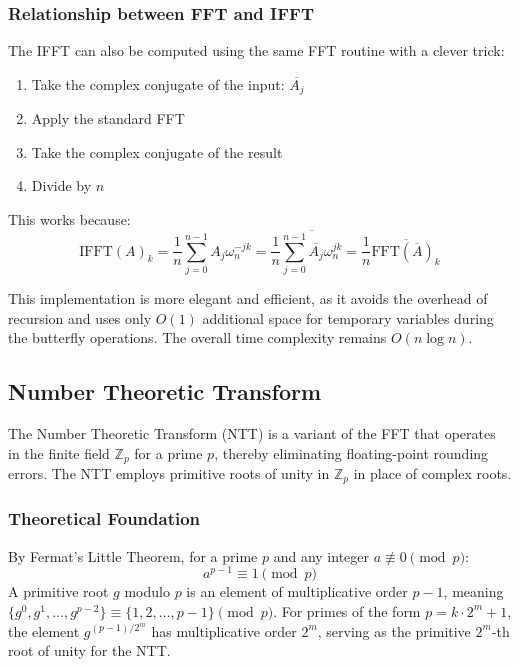 \documentclass[a4paper]{article}
\theoremstyle{definition}
\begin{document}
\subsubsection{Relationship between FFT and IFFT}

The IFFT can also be computed using the same FFT routine with a clever trick:
\begin{enumerate}
    \item Take the complex conjugate of the input: \(\overline{A_j}\)
    \item Apply the standard FFT
    \item Take the complex conjugate of the result
    \item Divide by \(n\)
\end{enumerate}

This works because:
\[
\text{IFFT}(A)_k = \frac{1}{n} \sum_{j=0}^{n-1} A_j \omega_n^{-jk} = \frac{1}{n} \overline{\sum_{j=0}^{n-1} \overline{A_j} \omega_n^{jk}} = \frac{1}{n} \overline{\text{FFT}(\overline{A})_k}
\]

This implementation is more elegant and efficient, as it avoids the overhead of recursion 
and uses only \( O(1) \) additional space for temporary variables during the butterfly operations. 
The overall time complexity remains \( O(n \log n) \).

\subsection{Number Theoretic Transform}

The Number Theoretic Transform (NTT) is a variant of the FFT that operates in the finite field $\mathbb{Z}_p$ for a prime $p$, thereby eliminating floating-point rounding errors. The NTT employs primitive roots of unity in $\mathbb{Z}_p$ in place of complex roots.

\subsubsection{Theoretical Foundation}

By Fermat's Little Theorem, for a prime $p$ and any integer $a \not\equiv 0 \pmod{p}$:
\[
a^{p-1} \equiv 1 \pmod{p}
\]
A primitive root $g$ modulo $p$ is an element of multiplicative order $p-1$, meaning $\{g^0, g^1, \ldots, g^{p-2}\} \equiv \{1, 2, \ldots, p-1\} \pmod{p}$. For primes of the form $p = k \cdot 2^m + 1$, the element $g^{(p-1)/2^m}$ has multiplicative order $2^m$, serving as the primitive $2^m$-th root of unity for the NTT.
\end{document}
